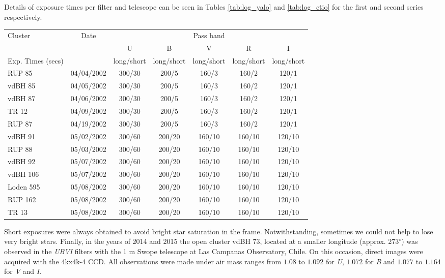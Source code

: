 \documentclass{aa}
\begin{document}
Details of exposure times per filter and telescope can be seen in Tables
\ref{tab:log_yalo} and \ref{tab:log_ctio} for the first and second series respectively.\\


\begin{table*}[ht]
    \centering
    \begin{tabular}{lcccccc}
    \hline 
        Cluster & Date &  &  & Pass band &  & \\
        &  & U & B & V & R & I\\
        Exp. Times (secs) &  & long/short & long/short & long/short & long/short & long/short\\
       \hline \hline 
        RUP 85 & 04/04/2002 & 300/30 & 200/5 & 160/3 & 160/2 & 120/1\\
        vdBH 85 & 04/05/2002 & 300/30 & 200/5 & 160/3 & 160/2 & 120/1\\
        vdBH 87 & 04/06/2002 & 300/30 & 200/5 & 160/3 & 160/2 & 120/1\\
        TR 12 & 04/09/2002 & 300/30 & 200/5 & 160/3 & 160/2 & 120/1\\
        RUP 87 & 04/19/2002 & 300/30 & 200/5 & 160/3 & 160/2 & 120/1\\
        vdBH 91 & 05/02/2002 & 300/60 & 200/20 & 160/10 & 160/10 & 120/10\\
        RUP 88 & 05/03/2002 & 300/60 & 200/20 & 160/10 & 160/10 & 120/10\\
        vdBH 92 & 05/07/2002 & 300/60 & 200/20 & 160/10 & 160/10 & 120/10\\
        vdBH 106 & 05/07/2002 & 300/60 & 200/20 & 160/10 & 160/10 & 120/10\\
        Loden 595 & 05/08/2002 & 300/60 & 200/20 & 160/10 & 160/10 & 120/10\\
        RUP 162 & 05/08/2002 & 300/60 & 200/20 & 160/10 & 160/10 & 120/10\\
        TR 13 & 05/08/2002 & 300/60 & 200/20 & 160/10 & 160/10 & 120/10\\
        \hline
    \end{tabular}
    \caption{Log of observations at YALO.}
    \label{tab:log_yalo}
\end{table*}

Short exposures were always obtained to avoid bright star saturation in the
frame. Notwithstanding, sometimes we could not help to lose very bright stars.
Finally, in the years of 2014 and 2015 the open cluster vdBH 73,
located at a smaller longitude (approx. 273$^\circ$) was observed in the 
\textit{UBVI} filters with the 1 m Swope telescope at Las Campanas Observatory,
Chile. On this occasion, direct images were acquired with the 4kx4k-4 CCD. All
observations were made under air mass ranges from $1.08$ to $1.092$ for 
\textit{U}, $1.072$ for \textit{B} and $1.077$ to $1.164$ for \textit{V} and 
\textit{I}.
\end{document}
